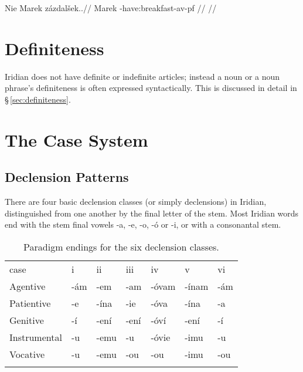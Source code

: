 \pex
\begingl
    \gla Nie Marek zázdalšek..//
    \glb {} Marek -have:breakfast-{av-pf} //
    \glft {}//
\endgl
\xe


\section{Definiteness}
Iridian does not have definite or indefinite articles; instead a noun or a noun phrase's definiteness is often expressed syntactically. This is discussed in detail in \S\,\ref{sec:definiteness}.

\section{The Case System}

\subsection{Declension Patterns}

There are four basic declension classes (or simply declensions) in Iridian, distinguished from one another by the final letter of the stem. Most Iridian words end with the stem final vowels -a, -e, -o, -ó or -i, or with a consonantal stem.


\begin{table}[h]
    \small
    \caption{Paradigm endings for the six declension classes.}
    \medskip
    \begin{tabu} to \textwidth {Y[2]YYYYYY}
    \toprule\addlinespace
            {\sc case}          &{\sc i} &{\sc ii} & {\sc iii} &{\sc iv} &{\sc v} &{\sc vi} \\ \addlinespace
    \midrule\addlinespace
        Agentive    & -ám   & -em     & -am    & -óvam  & -ínam    & -ám\\ \addlinespace
        Patientive  & -e      & -ína  & -ie    & -óva   & -ína     & -a\\ \addlinespace
        Genitive    & -í    & -ení  & -ení & -óví & -ení     & -í\\ \addlinespace
        Instrumental& -u      & -emu    & -u     & -óvie  & -imu       & -u\\ \addlinespace
        Vocative    & -u      & -emu    & -ou    & -ou      & -imu       & -ou\\ \addlinespace
    \bottomrule
    \end{tabu}
\end{table}


